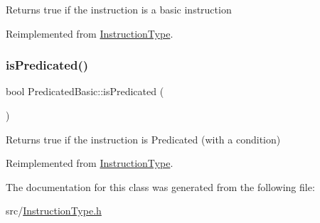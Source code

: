 Returns true if the instruction is a basic instruction 

Reimplemented from \hyperlink{classInstructionType_ada75c9091ab7e6b4b9a7df984288d1f8}{Instruction\+Type}.

\mbox{\label{classPredicatedBasic_aa63e9f18308f45cc3f74e27d9db3ef29}} 
\subsubsection{\texorpdfstring{is\+Predicated()}{isPredicated()}}
{\footnotesize\ttfamily bool Predicated\+Basic\+::is\+Predicated (\begin{DoxyParamCaption}{ }\end{DoxyParamCaption})\hspace{0.3cm}{\ttfamily [virtual]}}

Returns true if the instruction is Predicated (with a condition) 

Reimplemented from \hyperlink{classInstructionType_a5b28d5b2e495222817facca7b8826975}{Instruction\+Type}.



The documentation for this class was generated from the following file\+:\begin{DoxyCompactItemize}
\item 
src/\hyperlink{InstructionType_8h}{Instruction\+Type.\+h}\end{DoxyCompactItemize}

